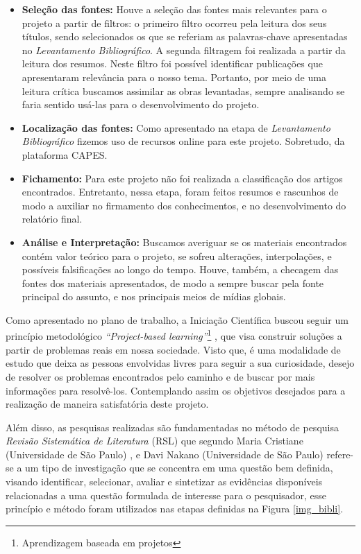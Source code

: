 \begin{itemize}
\item \textbf{Seleção das fontes:} Houve a seleção das fontes mais relevantes para o projeto a partir de filtros: o primeiro filtro ocorreu pela leitura dos seus títulos, sendo selecionados os que se referiam as palavras-chave apresentadas no \textit{Levantamento Bibliográfico}. A segunda filtragem foi realizada a partir da leitura dos resumos. Neste filtro foi possível identificar publicações que apresentaram relevância para o nosso tema.
Portanto, por meio de uma leitura crítica buscamos assimilar as obras levantadas, sempre analisando se faria sentido usá-las para o desenvolvimento do projeto. 

\item \textbf{Localização das fontes:} Como apresentado na etapa de  \textit{Levantamento Bibliográfico} fizemos uso de recursos online para este projeto. Sobretudo, da plataforma CAPES.

\item \textbf{Fichamento:} Para este projeto não foi realizada a classificação dos artigos encontrados. Entretanto, nessa etapa, foram feitos resumos e rascunhos de modo a auxiliar no firmamento dos conhecimentos, e no desenvolvimento do relatório final.

\item \textbf{Análise e Interpretação:} Buscamos averiguar se os materiais encontrados contém valor teórico para o projeto, se sofreu alterações, interpolações, e possíveis falsificações ao longo do tempo. Houve, também, a checagem das fontes dos materiais apresentados, de modo a sempre buscar pela fonte principal do assunto, e nos principais meios de mídias globais.


\end{itemize}

 
Como apresentado no plano de trabalho, a Iniciação Científica buscou seguir um princípio metodológico \textit{“Project-based learning”}\footnote{Aprendizagem baseada em projetos} \cite{krajcik2006project}, que visa construir soluções a partir de problemas reais em nossa sociedade. Visto que, é uma modalidade de estudo que deixa as pessoas envolvidas livres para seguir a sua curiosidade, desejo de resolver os problemas encontrados pelo caminho e de buscar por mais informações para resolvê-los. Contemplando assim os objetivos desejados para a realização de maneira satisfatória deste projeto. 

Além disso, as pesquisas realizadas são fundamentadas no método de pesquisa \textit{Revisão Sistemática de Literatura} (RSL) que segundo Maria Cristiane (Universidade de São Paulo) \cite{revi3}, e Davi Nakano (Universidade de São Paulo) \cite{revi2} refere-se a um tipo de investigação que se concentra em uma questão bem definida, visando identificar, selecionar, avaliar e sintetizar as evidências disponíveis relacionadas a uma questão formulada de interesse para o pesquisador, esse princípio e método foram utilizados nas etapas definidas na Figura \ref{img_bibli}.

